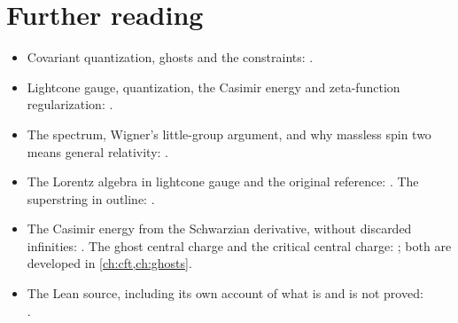\section*{Further reading}
\begin{itemize}[leftmargin=*]
\item Covariant quantization, ghosts and the constraints:
.
\item Lightcone gauge, quantization, the Casimir energy and zeta-function regularization:
.
\item The spectrum, Wigner's little-group argument, and why massless spin two means general
relativity: .
\item The Lorentz algebra in lightcone gauge and the original reference:
. The superstring in outline:
.
\item The Casimir energy from the Schwarzian derivative, without discarded infinities:
. The ghost central charge and the critical central
charge: ; both are developed in
\cref{ch:cft,ch:ghosts}.
\item The Lean source, including its own account of what is and is not proved:\\
.
\end{itemize}
